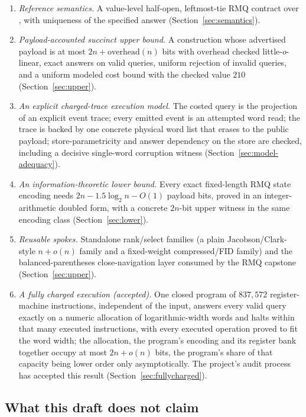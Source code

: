 \documentclass[11pt]{article}
\newcommand{\ledger}[1]{}
\newcommand{\leanid}[1]{\ifmmode\text{\ttfamily\upshape #1}\else{\def\UrlFont{\ttfamily\upshape}\nolinkurl{#1}}\fi}
\theoremstyle{definition}
\theoremstyle{remark}
\begin{document}
\begin{enumerate}
\item \emph{Reference semantics.} A value-level half-open, leftmost-tie RMQ
  contract over \leanid{List Int}, with uniqueness of the specified answer
  (Section~\ref{sec:semantics}).
\item \emph{Payload-accounted succinct upper bound.} A construction whose
  advertised payload is at most $2n + \mathrm{overhead}(n)$ bits with
  $\mathrm{overhead}$ checked little-$o$-linear, exact answers on valid
  queries, uniform rejection of invalid queries, and a uniform modeled cost
  bound with the checked value $210$
  (Section~\ref{sec:upper}).\ledger{L-UB-01}
\item \emph{An explicit charged-trace execution model.} The costed query is
  the projection of an explicit event trace; every emitted event is an
  attempted word read; the trace is backed by one concrete physical word
  list that erases to the public payload; store-parametricity and
  answer dependency on the store are checked, including a decisive
  single-word corruption witness (Section~\ref{sec:model-adequacy}).
\item \emph{An information-theoretic lower bound.} Every exact fixed-length
  RMQ state encoding needs $2n - 1.5\log_2 n - O(1)$ payload bits, proved in
  an integer-arithmetic doubled form, with a concrete $2n$-bit upper witness
  in the same encoding class (Section~\ref{sec:lower}).\ledger{L-LB-01}
\item \emph{Reusable spokes.} Standalone rank/select families (a plain
  Jacobson/Clark-style $n + o(n)$ family and a fixed-weight compressed/FID
  family) and the balanced-parentheses close-navigation layer consumed by
  the RMQ capstone (Section~\ref{sec:upper}).
\item \emph{A fully charged execution (accepted).} One closed program of
  $837{,}572$ register-machine instructions, independent of the input,
  answers every valid query exactly on a numeric allocation of
  logarithmic-width words and halts within that many executed instructions,
  with every executed operation proved to fit the word width; the
  allocation, the program's encoding and its register bank together occupy
  at most $2n + o(n)$ bits, the program's share of that capacity being
  lower order only asymptotically. The project's audit process has accepted this result (Section~\ref{sec:fullycharged}).\ledger{L-PQ-01}
\end{enumerate}

\subsection{What this draft does not claim}\label{sec:nonclaims-intro}
\end{document}
